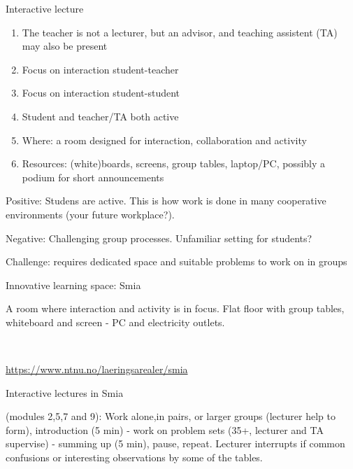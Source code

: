 \documentclass[ignorenonframetext,]{beamer}
\providecommand{\tightlist}{%
  \setlength{\itemsep}{0pt}\setlength{\parskip}{0pt}}
\begin{document}
\begin{frame}

\begin{block}{Interactive lecture}

\begin{enumerate}
\def\labelenumi{\arabic{enumi})}
\tightlist
\item
  The teacher is not a lecturer, but an advisor, and teaching assistent
  (TA) may also be present
\item
  Focus on interaction student-teacher
\item
  Focus on interaction student-student
\item
  Student and teacher/TA both active
\item
  Where: a room designed for interaction, collaboration and activity
\item
  Resources: (white)boards, screens, group tables, laptop/PC, possibly a
  podium for short announcements
\end{enumerate}

Positive: Studens are active. This is how work is done in many
cooperative environments (your future workplace?).

Negative: Challenging group processes. Unfamiliar setting for students?

Challenge: requires dedicated space and suitable problems to work on in
groups

\end{block}

\end{frame}

\begin{frame}

\begin{block}{Innovative learning space: Smia}

A room where interaction and activity is in focus. Flat floor with group
tables, whiteboard and screen - PC and electricity outlets.

~

\url{https://www.ntnu.no/laeringsarealer/smia}

\end{block}

\end{frame}

\begin{frame}

\begin{block}{Interactive lectures in Smia}

(modules 2,5,7 and 9): Work alone,in pairs, or larger groups (lecturer
help to form), introduction (5 min) - work on problem sets (35+,
lecturer and TA supervise) - summing up (5 min), pause, repeat. Lecturer
interrupts if common confusions or interesting observations by some of
the tables.

\end{block}

\end{frame}
\end{document}
